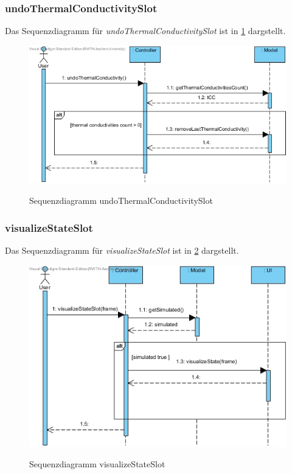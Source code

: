 \subsubsection*{undoThermalConductivitySlot}

Das Sequenzdiagramm für \emph{undoThermalConductivitySlot} ist in \ref{Sequenzdiagramm undoThermalConductivitySlot} dargstellt.

\begin{figure}[H]
	\centering
	\includegraphics[scale=.6]{Bilder/Controller__undoThermalConductivitySlot().jpg}\\
	\caption{Sequenzdiagramm undoThermalConductivitySlot}
	\label{Sequenzdiagramm undoThermalConductivitySlot}
\end{figure}

\subsubsection*{visualizeStateSlot}

Das Sequenzdiagramm für \emph{visualizeStateSlot} ist in \ref{Sequenzdiagramm visualizeStateSlot} dargstellt.

\begin{figure}[H]
	\centering
	\includegraphics[scale=.6]{Bilder/Controller__visualizeStateSlot().jpg}\\
	\caption{Sequenzdiagramm visualizeStateSlot}
	\label{Sequenzdiagramm visualizeStateSlot}
\end{figure}